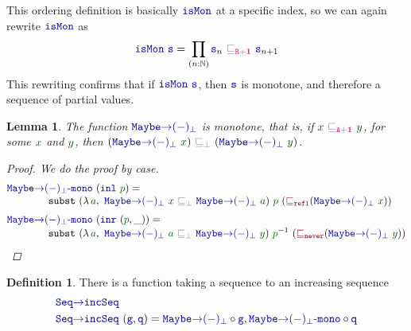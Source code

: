 \documentclass[twoside,11pt,openright]{report}
\theoremstyle{plain} %
\newtheorem{lem}[thm]{Lemma}
\theoremstyle{definition}
\newtheorem{defn}{Definition}[section]
\theoremstyle{remark}
\newcommand*{\term}[1]{\textcolor{green!30!black}{#1}} %
\newcommand*{\pathterm}[1]{\textcolor{green!40!black}{#1}}
\newcommand*{\type}[1]{\textcolor{magenta!90!black}{#1}}
\newcommand*{\unit}{\type{\textbf{1}}}
\newcommand*{\relation}[1]{\textcolor{gray}{\ensuremath{\mathtt{#1}}}}
\newcommand*{\function}[1]{\textcolor{blue!60!black}{\ensuremath{\mathtt{#1}}}}
\newcommand*{\constructor}[1]{\textcolor{purple!60!black}{\ensuremath{\mathtt{#1}}}}
\newcommand*{\sym}[1]{\ensuremath{#1^{-1}}}
\begin{document}
\noindent This ordering definition is basically \(\function{isMon}\) at a specific index, so we can again rewrite \(\function{isMon}\) as
\begin{equation}
  \function{isMon}~\function{s} = \prod_{(n : \mathbb{N})} \function{s}_n~\relation{\sqsubseteq_{\type{R} + \unit}}~\function{s}_{n+1}
\end{equation}
This rewriting confirms that if \(\function{isMon}~\function{s}\), then \(\function{s}\) is monotone, and therefore a sequence of partial values.
\begin{lem}
  The function \(\function{Maybe{\rightarrow}(-)_\bot}\) is monotone, that is, if \(\term{x}~\relation{\sqsubseteq_{\type{A} + \unit}}~\term{y}\), for some \(\term{x}\) and \(\term{y}\), then \((\function{Maybe{\rightarrow}(-)_\bot}~\term{x})~\relation{\sqsubseteq_{\bot}}~(\function{Maybe{\rightarrow}(-)_\bot}~\term{y})\).
  \begin{proof}
    We do the proof by case.
    \begin{equation}
      \begin{aligned}
        &\function{Maybe{\rightarrow}(-)_\bot\text{-}mono}~(\function{inl}~\pathterm{p}) = \\[-1mm]
        &\qquad\qquad \mathtt{subst}~(\lambda\,\term{a},~\function{Maybe{\rightarrow}(-)_\bot}~\term{x}~\relation{\sqsubseteq_{\bot}}~\function{Maybe{\rightarrow}(-)_\bot}~\term{a})~\pathterm{p}~(\constructor{\sqsubseteq_{refl}} (\function{Maybe{\rightarrow}(-)_\bot}~\term{x})) \\[1mm]
        &\function{Maybe{\rightarrow}(-)_\bot\text{-}mono}~(\function{inr}~(\pathterm{p}, \_)) = \\[-1mm]
        &\qquad\qquad \mathtt{subst}~(\lambda\,\term{a},~\function{Maybe{\rightarrow}(-)_\bot}~\term{a}~\relation{\sqsubseteq_{\bot}}~\function{Maybe{\rightarrow}(-)_\bot}~\term{y})~\sym{\pathterm{p}}~(\constructor{\sqsubseteq_{never}} (\function{Maybe{\rightarrow}(-)_\bot}~\term{y}))
      \end{aligned}
    \end{equation}
  \end{proof}
\end{lem}
\begin{defn}
  There is a function taking a sequence to an increasing sequence 
  \begin{equation}
    \begin{aligned}
      &\function{Seq{\rightarrow}incSeq} \\
      &\function{Seq{\rightarrow}incSeq}~(\function{g} , \function{q}) = \function{Maybe{\rightarrow}(-)_\bot} \circ \function{g} , \function{Maybe{\rightarrow}(-)_\bot\text{-}mono} \circ \function{q}
    \end{aligned}
  \end{equation}
\end{defn}
\end{document}
